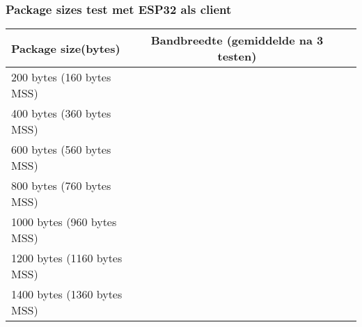 \documentclass[../DCM2_Verslag.tex]{subfiles}
\begin{document}

\subsubsection{Package sizes test met ESP32 als client}
	\begin{tabular}{||l|c|r|p{6cm}||}
   	 Package size(bytes) & Bandbreedte (gemiddelde na 3 testen)\\
   	 \hline \hline    
   	 200 bytes (160 bytes MSS) &  \\
   	 400 bytes (360 bytes MSS) &  \\
   	 600 bytes (560 bytes MSS) &  \\
   	 800 bytes (760 bytes MSS) &  \\
   	 1000 bytes (960 bytes MSS) & \\
   	 1200 bytes (1160 bytes MSS) &  \\
   	 1400 bytes (1360 bytes MSS) & \\
   	 \hline
	\end{tabular}
	
\end{document}
